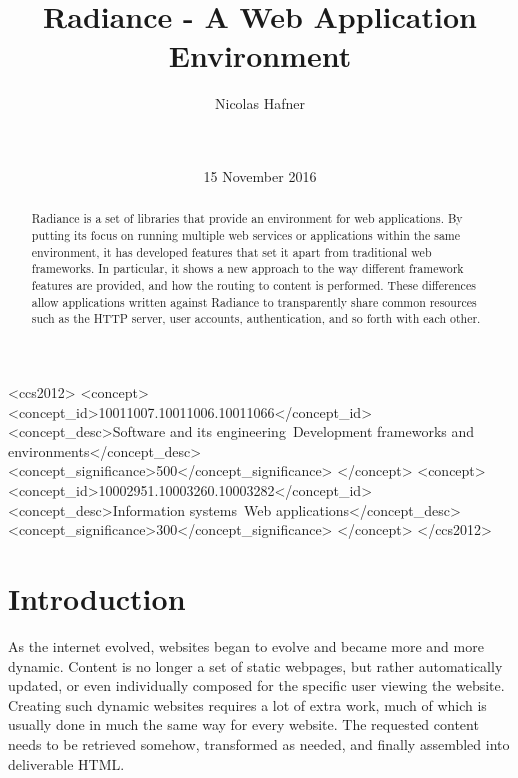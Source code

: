 \documentclass{sig-alternate}
\begin{document}
\doi{}
\isbn{}

\begin{CCSXML}
<ccs2012>
  <concept>
    <concept_id>10011007.10011006.10011066</concept_id>
    <concept_desc>Software and its engineering~Development frameworks and environments</concept_desc>
    <concept_significance>500</concept_significance>
  </concept>
  <concept>
    <concept_id>10002951.10003260.10003282</concept_id>
    <concept_desc>Information systems~Web applications</concept_desc>
    <concept_significance>300</concept_significance>
  </concept>
</ccs2012>
\end{CCSXML}


\title{Radiance - A Web Application Environment}

\author{
\alignauthor
Nicolas Hafner\\
       \\
       \\
}
\date{15 November 2016}

\maketitle

\begin{abstract}
  Radiance\cite{radiance} is a set of libraries that provide an environment for web applications. By putting its focus on running multiple web services or applications within the same environment, it has developed features that set it apart from traditional web frameworks. In particular, it shows a new approach to the way different framework features are provided, and how the routing to content is performed. These differences allow applications written against Radiance to transparently share common resources such as the HTTP server, user accounts, authentication, and so forth with each other.
\end{abstract}

\printccsdesc

\newpage

\section{Introduction}
As the internet evolved, websites began to evolve and became more and more dynamic. Content is no longer a set of static webpages, but rather automatically updated, or even individually composed for the specific user viewing the website. Creating such dynamic websites requires a lot of extra work, much of which is usually done in much the same way for every website. The requested content needs to be retrieved somehow, transformed as needed, and finally assembled into deliverable HTML. \\
\end{document}
